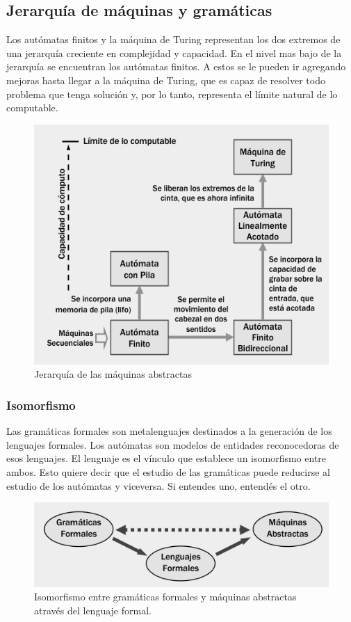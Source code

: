 \documentclass[12pt]{article}
\begin{document}
\subsection{Jerarquía de máquinas y gramáticas}
Los autómatas finitos y la máquina de Turing representan los dos extremos de una jerarquía creciente en complejidad y capacidad. En el nivel mas bajo de la jerarquía se encuentran los autómatas finitos. A estos se le pueden ir agregando mejoras hasta llegar a la máquina de Turing, que es capaz de resolver todo problema que tenga solución y, por lo tanto, representa el límite natural de lo computable.
\begin{figure}[H]
	\centering
	\includegraphics[width=0.7\linewidth]{imagenes/jerarquia_maquinas_abstractas.png}
	\caption{Jerarquía de las máquinas abstractas}
	\label{fig:jerarquia_maquinas}
\end{figure}

\subsubsection{Isomorfismo}
Las gramáticas formales son metalenguajes destinados a la generación de los lenguajes formales. Los autómatas son modelos de entidades reconocedoras de esos lenguajes. El lenguaje es el vínculo que establece un isomorfismo entre ambos. Esto quiere decir que el estudio de las gramáticas puede reducirse al estudio de los autómatas y viceversa. Si entendes uno, entendés el otro.
\begin{figure}[H]
	\centering
	\includegraphics[width=0.7\linewidth]{imagenes/isomorfismo.png}
	\caption{Isomorfismo entre gramáticas formales y máquinas abstractas através del lenguaje formal.}
	\label{fig:isomorfismo}
\end{figure}
\end{document}
